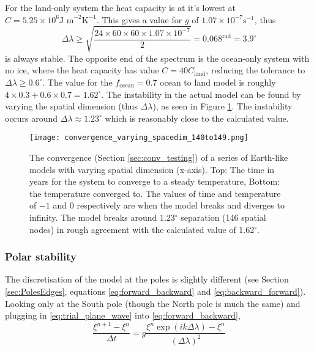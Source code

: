 \documentclass[12pt, onecolumn]{revtex4-2}    %
\begin{document}
For the land-only system the heat capacity is at it's lowest at $C=5.25\times10^6 \text{J m}^{-2} \text{K}^{-1}$.
This gives a value for $g$ of $1.07\times10^{-7} \text{s}^{-1}$, thus
\begin{equation*}
    \Delta\lambda \ge \sqrt{\frac{24\times60\times60\times1.07\times10^{-7}}{2}} = 0.068 ^{\text{rad}} = 3.9 ^{\circ}
\end{equation*}
is always stable.
The opposite end of the spectrum is the ocean-only system with no ice, where the heat capacity has value $C = 40 C_{\text{land}}$, reducing the tolerance to $\Delta\lambda \ge 0.6 ^{\circ}$.
The value for the $f_{\text{ocean}} = 0.7$ ocean to land model is roughly $4 \times 0.3 + 0.6 \times 0.7 = 1.62^{\circ}$.
The instability in the actual model can be found by varying the spatial dimension (thus $\Delta \lambda$), as seen in Figure \ref{fig:conv_spacedim}.
The instability occurs around $\Delta\lambda \approx 1.23^{\circ}$ which is reasonably close to the calculated value.

\begin{figure}[h]
    \texttt{[image: convergence\_varying\_spacedim\_140to149.png]}
    \caption{The convergence (Section \ref{sec:conv_testing}) of a series of Earth-like models with varying spatial dimension (x-axis). Top: The time in years for the system to converge to a steady temperature, Bottom: the temperature converged to.
        The values of time and temperature of $-1$ and $0$ respectively are when the model breaks and diverges to infinity.
        The model breaks around 1.23$^{\circ}$ separation (146 spatial nodes) in rough agreement with the calculated value of 1.62$^{\circ}$. }
    \label{fig:conv_spacedim}
\end{figure}

\subsubsection*{Polar stability}
The discretisation of the model at the poles is slightly different (see Section \ref{sec:PolesEdges}, equations \eqref{eq:forward_backward} and \eqref{eq:backward_forward}).
Looking only at the South pole (though the North pole is much the same) and plugging in \eqref{eq:trial_plane_wave} into \eqref{eq:forward_backward},
\begin{equation}
    \frac{\xi^{n+1} - \xi^{n}}{\Delta t} = g\frac{\xi^n \exp(i k \Delta\lambda) - \xi^n}{(\Delta\lambda)^2}
\end{equation}
\end{document}
